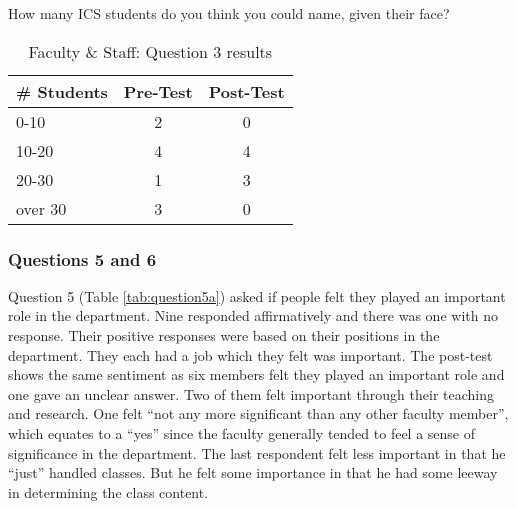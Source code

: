 \begin{table}[htb]
\caption{Faculty \& Staff: Question 3 results}
{How many ICS students do you think you could name, given their face?}
\begin{center}
\begin{tabular}{|l|l|l|} \hline
 \multicolumn{1}{|c|}{\bf \# Students} &
 \multicolumn{1}{|c|}{\bf Pre-Test} &
 \multicolumn{1}{|c|}{\bf Post-Test} \\ \hline
 0-10    & \multicolumn{1}{|c|}{2} & \multicolumn{1}{|c|}{0}\\ \hline 
 10-20   & \multicolumn{1}{|c|}{4} & \multicolumn{1}{|c|}{4}\\ \hline 
 20-30   & \multicolumn{1}{|c|}{1} & \multicolumn{1}{|c|}{3}\\ \hline 
 over 30 & \multicolumn{1}{|c|}{3} & \multicolumn{1}{|c|}{0}\\ \hline
\end{tabular}
\end{center}
\label{tab:question3a}
\end{table}

\subsubsection{Questions 5 and 6}

Question 5 (Table \ref{tab:question5a}) asked if people felt they played an
important role in the department.  Nine responded affirmatively and there was
one with no response.  Their positive responses were based on their positions
in the department.  They each had a job which they felt was important.  The
post-test shows the same sentiment as six members felt they played an important
role and one gave an unclear answer.  Two of them felt important through their
teaching and research.  One felt ``not any more significant than any other
faculty member'', which equates to a ``yes'' since the faculty generally tended
to feel a sense of significance in the department.  The last respondent felt
less important in that he ``just'' handled classes.  But he felt some
importance in that he had some leeway in determining the class content.

